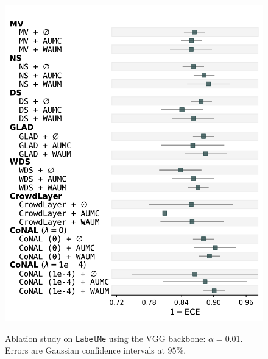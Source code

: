 \begin{figure}[th]
\begin{minipage}{0.45\textwidth}
        \includegraphics[width=\linewidth]{images/ECE_foresplot_labelme.pdf}
        \label{fig:forest_labelme_ece}
    \end{minipage}
    \caption{Ablation study on \texttt{LabelMe} using the VGG backbone: $\alpha=0.01$. Errors are Gaussian confidence intervals at $95\%$.}
    \label{fig:forest_labelme}
\end{figure}

